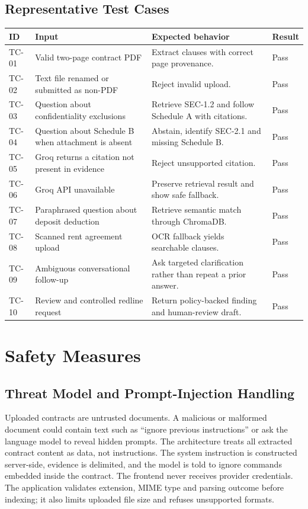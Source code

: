 \documentclass[12pt,a4paper,oneside]{report}
\begin{document}
\subsection{Representative Test Cases}
\begin{longtable}{p{}p{}p{}p{}}
\toprule
\textbf{ID} & \textbf{Input} & \textbf{Expected behavior} & \textbf{Result}\\
\midrule
TC-01 & Valid two-page contract PDF & Extract clauses with correct page provenance. & Pass\\
TC-02 & Text file renamed or submitted as non-PDF & Reject invalid upload. & Pass\\
TC-03 & Question about confidentiality exclusions & Retrieve SEC-1.2 and follow Schedule A with citations. & Pass\\
TC-04 & Question about Schedule B when attachment is absent & Abstain, identify SEC-2.1 and missing Schedule B. & Pass\\
TC-05 & Groq returns a citation not present in evidence & Reject unsupported citation. & Pass\\
TC-06 & Groq API unavailable & Preserve retrieval result and show safe fallback. & Pass\\
TC-07 & Paraphrased question about deposit deduction & Retrieve semantic match through ChromaDB. & Pass\\
TC-08 & Scanned rent agreement upload & OCR fallback yields searchable clauses. & Pass\\
TC-09 & Ambiguous conversational follow-up & Ask targeted clarification rather than repeat a prior answer. & Pass\\
TC-10 & Review and controlled redline request & Return policy-backed finding and human-review draft. & Pass\\
\bottomrule
\end{longtable}

\section{Safety Measures}
\subsection{Threat Model and Prompt-Injection Handling}
Uploaded contracts are untrusted documents. A malicious or malformed document could contain text such as ``ignore previous instructions'' or ask the language model to reveal hidden prompts. The architecture treats all extracted contract content as data, not instructions. The system instruction is constructed server-side, evidence is delimited, and the model is told to ignore commands embedded inside the contract. The frontend never receives provider credentials. The application validates extension, MIME type and parsing outcome before indexing; it also limits uploaded file size and refuses unsupported formats.
\end{document}
